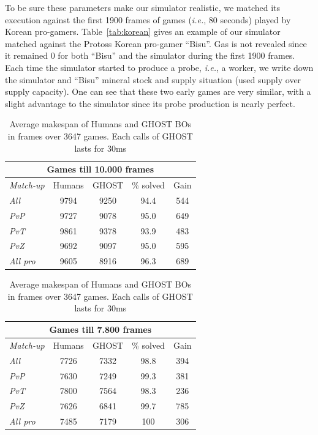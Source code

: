 \documentclass[journal]{IEEEtran}
\newcommand{\ghost}{\textsc{GHOST}\xspace}
\newcommand{\ie}{\textit{i.e.}}
\begin{document}
To be sure these parameters make our simulator realistic, we matched its
execution  against the  first  1900 frames of  games (\ie, 80 seconds) played by  Korean
pro-gamers. Table~\ref{tab:korean}  gives an  example of  our simulator
matched against the Protoss Korean pro-gamer ``Bisu''. Gas
is not revealed since it remained 0 for both ``Bisu'' and the simulator
during the first 1900 frames. Each time the simulator started to produce
a probe, \ie,  a worker, we write down the  simulator and ``Bisu'' mineral
stock and supply situation (used supply over supply capacity). One can
see  that  these two  early  games  are  very  similar, with  a  slight
advantage  to  the simulator  since  its  probe production  is  nearly
perfect.
\begin{table}[ht]
  \caption{Average  makespan  of Humans  and  \ghost  BOs  in
    frames over 3647 games. Each calls  of \ghost
    lasts for 30ms}
  \label{tab:bo}
  \centering
  \begin{tabular}{|l|c|c|c|c|}
    \hline
    \multicolumn{5}{|c|}{Games till 10.000 frames} \\
    \hline
    {\em Match-up} & Humans & \ghost & \% solved &
    Gain \\
    \hline
    {\em All} & 9794 & 9250 & 94.4 & 544\\
    {\em PvP} & 9727 & 9078 & 95.0 & 649\\
    {\em PvT} & 9861 & 9378 & 93.9 & 483\\
    {\em PvZ} & 9692 & 9097 & 95.0 & 595\\
    \hline
    \hline
    {\em All pro} & 9605 & 8916 & 96.3 & 689\\
    \hline
  \end{tabular}
  \begin{tabular}{|l|c|c|c|c|}
    \hline
    \multicolumn{5}{|c|}{Games till 7.800 frames} \\
    \hline
    {\em Match-up} & Humans & \ghost & \% solved &
    Gain \\
    \hline
    {\em All} & 7726 & 7332 & 98.8 & 394\\
    {\em PvP} & 7630 & 7249 & 99.3 & 381\\
    {\em PvT} & 7800 & 7564 & 98.3 & 236\\
    {\em PvZ} & 7626 & 6841 & 99.7 & 785\\
    \hline
    \hline
    {\em All pro} & 7485 & 7179 & 100 & 306\\
    \hline
  \end{tabular}
\end{table}
\end{document}

